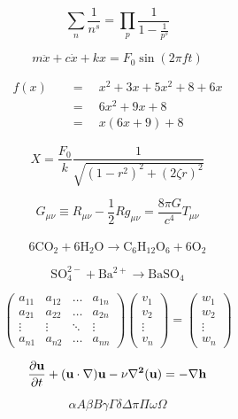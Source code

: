 \documentclass{article} %
\begin{document}
    
    \begin{equation}
    \sum_n \frac{1}{n^s}=\prod_p \frac{1}{1-\frac{1}{p^s}}
    \end{equation}
    
    
    \begin{equation*}         %
    m\ddot{x}+c\dot{x}+kx=F_0\sin(2\pi ft)
    \end{equation*}
    
    
    \begin{align*}
    f(x)\quad &=\quad x^2 + 3x + 5x^2 +8 +6x\\
    &=\quad 6x^2 +9x +8\\
    &=\quad x(6x+9)+8
    \end{align*}
    
    $$
    X=\frac{F_0}{k}\frac{1}{\sqrt{(1-r^2)^2+(2\zeta r)^2}}
    $$
    
    \begin{equation}
    G_{\mu\nu} \equiv R_{\mu\nu}-\frac{1}{2}Rg_{\mu\nu}=\frac{8\pi G}{c^4}T_{\mu\nu}
    \end{equation}\\
    
    $$\mathrm{6CO_2+6H_2O \to C_6H_{12}O_6+6O_2}$$
    
    $$\mathrm{SO_4^{2-}+Ba^{2+} \to BaSO_4 }$$
    
    \begin{equation}
    \begin{pmatrix}
    a_{11}&a_{12}&\dots&a_{1n}\\
    a_{21}&a_{22}&\dots&a_{2n}\\
    \vdots&\vdots&\ddots&\vdots\\
    a_{n1}&a_{n2}&\dots&a_{nn}
    \end{pmatrix}
    \begin{pmatrix}
    v_{1}\\
    v_{2}\\
    \vdots\\
    v_{n}
    \end{pmatrix}
    =
    \begin{pmatrix}
    w_{1}\\
    w_{2}\\
    \vdots\\
    w_{n}
    \end{pmatrix}
    \end{equation}
    
    \begin{equation}
    \frac{\partial{\bf{u}}}{\partial{t}}+(\bf{u}\cdot\nabla)\bf{u}-\nu\nabla^2\bf(u)=-\nabla h
    \end{equation}
    
    \[             %
    \alpha A \beta B \gamma \Gamma \delta \Delta \pi \Pi \omega \Omega 
    \]
    
\end{document}
